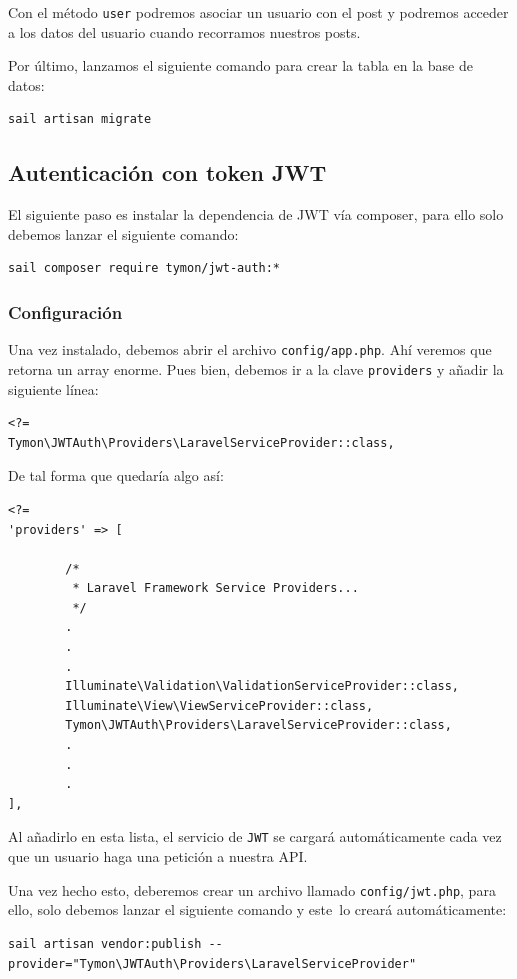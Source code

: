 \documentclass[11pt]{article}
\begin{document}
Con el método \texttt{user} podremos asociar un usuario con el post y podremos
acceder a los datos del usuario cuando recorramos nuestros posts.

Por último, lanzamos el siguiente comando para crear la tabla en la
base de datos:
\begin{verbatim}
sail artisan migrate
\end{verbatim}

\subsection{Autenticación con token JWT}
\label{sec:orgd42548d}
El siguiente paso es instalar la dependencia de JWT vía composer, para
ello solo debemos lanzar el siguiente comando:
\begin{verbatim}
sail composer require tymon/jwt-auth:*
\end{verbatim}

\subsubsection{Configuración}
\label{sec:org935c616}
Una vez instalado, debemos abrir el archivo \texttt{config/app.php}. Ahí
veremos que retorna un array enorme. Pues bien, debemos ir a la clave
\texttt{providers} y añadir la siguiente línea:
\begin{verbatim}
<?=
Tymon\JWTAuth\Providers\LaravelServiceProvider::class,
\end{verbatim}

De tal forma que quedaría algo así:
\begin{verbatim}
<?=
'providers' => [

        /*
         * Laravel Framework Service Providers...
         */
        .
        .
        .
        Illuminate\Validation\ValidationServiceProvider::class,
        Illuminate\View\ViewServiceProvider::class,
        Tymon\JWTAuth\Providers\LaravelServiceProvider::class,
        .
        .
        .
],
\end{verbatim}

Al añadirlo en esta lista, el servicio de \texttt{JWT} se cargará
automáticamente cada vez que un usuario haga una petición a nuestra
API.

Una vez hecho esto, deberemos crear un archivo llamado \texttt{config/jwt.php},
para ello, solo debemos lanzar el siguiente comando y este lo creará
automáticamente:
\begin{verbatim}
sail artisan vendor:publish --provider="Tymon\JWTAuth\Providers\LaravelServiceProvider"
\end{verbatim}
\end{document}
